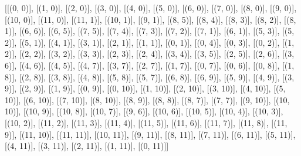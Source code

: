 [[(0, 0)], [(1, 0)], [(2, 0)], [(3, 0)], [(4, 0)], [(5, 0)], [(6, 0)], [(7, 0)], [(8, 0)], [(9, 0)], [(10, 0)], [(11, 0)], [(11, 1)], [(10, 1)], [(9, 1)], [(8, 5)], [(8, 4)], [(8, 3)], [(8, 2)], [(8, 1)], [(6, 6)], [(6, 5)], [(7, 5)], [(7, 4)], [(7, 3)], [(7, 2)], [(7, 1)], [(6, 1)], [(5, 3)], [(5, 2)], [(5, 1)], [(4, 1)], [(3, 1)], [(2, 1)], [(1, 1)], [(0, 1)], [(0, 4)], [(0, 3)], [(0, 2)], [(1, 2)], [(2, 2)], [(3, 2)], [(3, 3)], [(2, 3)], [(2, 4)], [(3, 4)], [(3, 5)], [(2, 5)], [(2, 6)], [(3, 6)], [(4, 6)], [(4, 5)], [(4, 7)], [(3, 7)], [(2, 7)], [(1, 7)], [(0, 7)], [(0, 6)], [(0, 8)], [(1, 8)], [(2, 8)], [(3, 8)], [(4, 8)], [(5, 8)], [(5, 7)], [(6, 8)], [(6, 9)], [(5, 9)], [(4, 9)], [(3, 9)], [(2, 9)], [(1, 9)], [(0, 9)], [(0, 10)], [(1, 10)], [(2, 10)], [(3, 10)], [(4, 10)], [(5, 10)], [(6, 10)], [(7, 10)], [(8, 10)], [(8, 9)], [(8, 8)], [(8, 7)], [(7, 7)], [(9, 10)], [(10, 10)], [(10, 9)], [(10, 8)], [(10, 7)], [(9, 6)], [(10, 6)], [(10, 5)], [(10, 4)], [(10, 3)], [(10, 2)], [(11, 2)], [(11, 3)], [(11, 4)], [(11, 5)], [(11, 6)], [(11, 7)], [(11, 8)], [(11, 9)], [(11, 10)], [(11, 11)], [(10, 11)], [(9, 11)], [(8, 11)], [(7, 11)], [(6, 11)], [(5, 11)], [(4, 11)], [(3, 11)], [(2, 11)], [(1, 11)], [(0, 11)]]